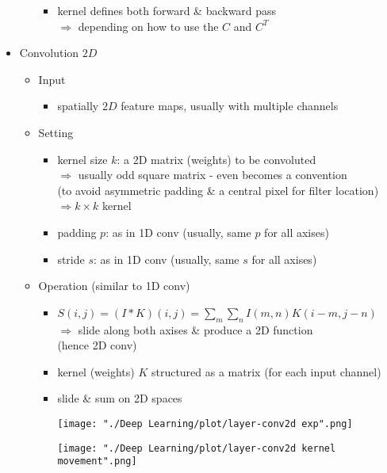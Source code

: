 \begin{itemize}
\begin{itemize}
\begin{itemize}
		\item kernel defines both forward \& backward pass \\
		$\Rightarrow$ depending on how to use the $C$ and $C^T$
		\end{itemize}
	\end{itemize}
\item Convolution $2D$
	\begin{itemize}
	\item Input
		\begin{itemize}
		\item spatially $2D$ feature maps, usually with multiple channels
		\end{itemize}
	\item Setting
		\begin{itemize}
		\item kernel size $k$: a 2D matrix (weights) to be convoluted \\
		$\Rightarrow$ usually odd square matrix - even becomes a convention \\
		(to avoid asymmetric padding \& a central pixel for filter location) \\
		$\Rightarrow k\times k$ kernel
		\item padding $p$: as in 1D conv (usually, same $p$ for all axises)
		\item stride $s$: as in 1D conv (usually, same $s$ for all axises)
		\end{itemize}
	\item Operation (similar to 1D conv)
		\begin{itemize}
		\item $\displaystyle S(i,j)= (I*K)(i,j) = \sum_m\sum_n I(m,n)K(i-m, j-n)$ \\
		$\Rightarrow$ slide along both axises \& produce a 2D function \\ 
		(hence 2D conv)
		\item kernel (weights) $K$ structured as a matrix (for each input channel)
		\item slide \& sum on 2D spaces \\
		\begin{minipage}[r]{.7\linewidth}
		\texttt{[image: "./Deep Learning/plot/layer-conv2d exp".png]}
		\end{minipage}
		\begin{minipage}[l]{.3\linewidth}
		\texttt{[image: "./Deep Learning/plot/layer-conv2d kernel movement".png]}
		\end{minipage}

\end{itemize}
\end{itemize}
\end{itemize}
